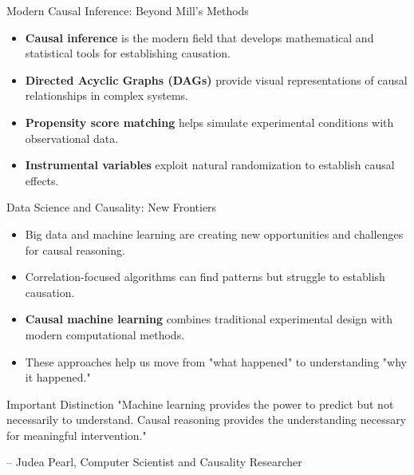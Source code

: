 \documentclass{beamer}
\begin{document}
\begin{frame}{Modern Causal Inference: Beyond Mill's Methods}
    \begin{itemize}
        \item \textbf{Causal inference} is the modern field that develops mathematical and statistical tools for establishing causation.
        \item \textbf{Directed Acyclic Graphs (DAGs)} provide visual representations of causal relationships in complex systems.
        \item \textbf{Propensity score matching} helps simulate experimental conditions with observational data.
        \item \textbf{Instrumental variables} exploit natural randomization to establish causal effects.
    \end{itemize}
    
    \begin{center}
    \end{center}
\end{frame}

\begin{frame}{Data Science and Causality: New Frontiers}
    \begin{itemize}
        \item Big data and machine learning are creating new opportunities and challenges for causal reasoning.
        \item Correlation-focused algorithms can find patterns but struggle to establish causation.
        \item \textbf{Causal machine learning} combines traditional experimental design with modern computational methods.
        \item These approaches help us move from "what happened" to understanding "why it happened."
    \end{itemize}
    
    \begin{alertblock}{Important Distinction}
        "Machine learning provides the power to predict but not necessarily to understand. Causal reasoning provides the understanding necessary for meaningful intervention."
        
        – Judea Pearl, Computer Scientist and Causality Researcher
    \end{alertblock}
\end{frame}
\end{document}
